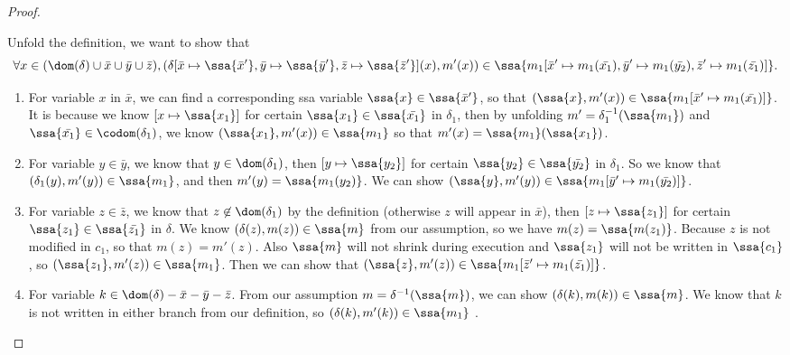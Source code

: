 \begin{proof}
\begin{itemize}
Unfold the definition, we want to show that $$\forall x  \in ( \dom(\delta) \cup \bar{x} \cup \bar{y} \cup \bar{z} ), (\delta[\bar{x} \mapsto \ssa{\bar{x}'},\bar{y} \mapsto \ssa{\bar{y}'},\bar{z} \mapsto \ssa{\bar{z}'} ](x), m'(x)) \in \ssa{m_1 [ \bar{x}' \mapsto {m_1}(\bar{x_1}),\bar{y}' \mapsto {m_1}(\bar{y_2}),\bar{z}' \mapsto {m_1}(\bar{z_1}) ] } .$$
\begin{enumerate}
    \item For variable $x$ in $\bar{x}$, we can find a corresponding ssa variable $\ssa{x} \in \ssa{\bar{x}'}$, so that $( \ssa{x}, m'(x) ) \in \ssa{ m_1 [\bar{x}' \mapsto m_1(\bar{x_1})] } $. It is because we know $[x \mapsto \ssa{x_1}]$ for certain $\ssa{x_1} \in \ssa{\bar{x_1}}$ in $\delta_1$, then by unfolding  $m' = \delta_1^{-1}(\ssa{m_1})$ and $\ssa{\bar{x_1}} \in \codom(\delta_1)$, we know $(\ssa{x_1}, m'(x)) \in \ssa{m_1}$ so that $m'(x) = \ssa{m_1}(\ssa{x_1})$.
    \item For variable $y \in \bar{y}$, we know that $y \in \dom(\delta_1)$, then $[ y \mapsto \ssa{y_2} ]$ for certain $\ssa{y_2} \in \ssa{\bar{y_2}}$ in $\delta_1$.  So we know that $(\delta_1(y), m'(y) ) \in \ssa{m_1}$, and then $m'(y) = \ssa{m_1(y_2)}$. We can show $(\ssa{y}, m'(y)) \in \ssa{m_1[\bar{y}' \mapsto m_1(\bar{y_2})]}$.
    \item For variable $z \in \bar{z}$, we know that $z \not\in \dom(\delta_1)$ by the definition (otherwise $z$ will appear in $\bar{x}$), then $[ z \mapsto \ssa{z_1} ]$ for certain $ \ssa{z_1} \in \ssa{\bar{z_1}}$ in $\delta$.  We know $(\delta(z), m(z)) \in \ssa{m}$ from our assumption, so we have $ m(z) = \ssa{m(z_1)}$. Because $z$ is not modified in $c_1$, so that $m(z) = m'(z)$. Also $\ssa{m}$ will not shrink during execution and $\ssa{z_1}$ will not be written in $\ssa{c_1}$, so $(\ssa{z_1}, m'(z)) \in \ssa{m_1}$. Then we can show that $ (\ssa{z}, m'(z) ) \in \ssa{m_1[\bar{z}' \mapsto m_1(\bar{z_1})] }$.
    \item For variable $k \in \dom(\delta)- \bar{x} - \bar{y}-\bar{z}$. From our assumption $ m = \delta^{-1}(\ssa{m})$, we can show $(\delta(k), m(k) ) \in \ssa{m}$. We know that $k$ is not written in either branch from our definition, so $(\delta(k), m'(k) ) \in \ssa{m_1} $ .
\end{enumerate}


\end{itemize}
\end{proof}
